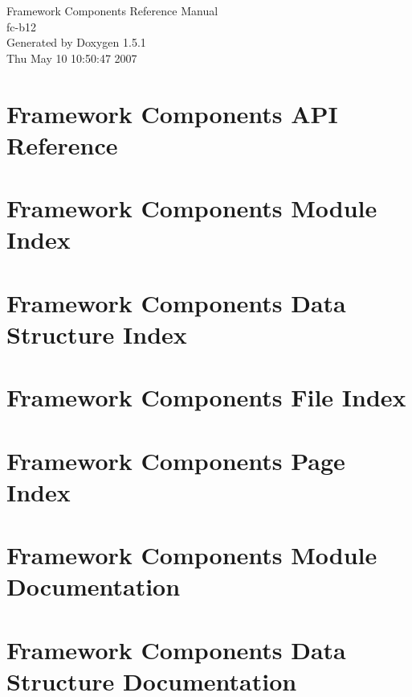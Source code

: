 \documentclass[letterpaper]{article}
\begin{document}
\begin{titlepage}
\vspace*{7cm}
\begin{center}
{\Large Framework Components Reference Manual\\[1ex]\large fc-b12 }\\
\vspace*{1cm}
{\large Generated by Doxygen 1.5.1}\\
\vspace*{0.5cm}
{\small Thu May 10 10:50:47 2007}\\
\end{center}
\end{titlepage}
\tableofcontents
{}
\section{Framework Components API Reference }
\label{index}\hypertarget{index}{}
\section{Framework Components Module Index}

\section{Framework Components Data Structure Index}

\section{Framework Components File Index}

\section{Framework Components Page Index}

\section{Framework Components Module Documentation}







\section{Framework Components Data Structure Documentation}












\end{document}
